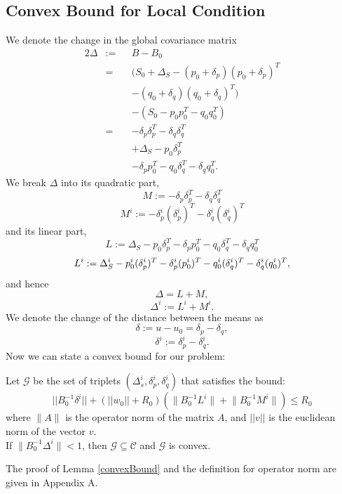 \subsection{Convex Bound for Local Condition}
We denote the change in the global covariance matrix
\begin{alignat*}{2}
\Delta & := && B-B_0 \\
& = && (S_0+\Delta_S - (p_0+\delta_p)(p_0+\delta_p)^T \\
& && - (q_0+\delta_q)(q_0+\delta_q)^T) \\
& && - (S_0 - p_0p_0^T - q_0q_0^T) \\
& = && - \delta_p\delta_p^T - \delta_q\delta_q^T \\
& && + \Delta_S - p_0\delta_p^T \\
& && - \delta_pp_0^T - q_0\delta_q^T - \delta_qq_0^T.
\end{alignat*}
We break $\Delta$ into its quadratic part,
\begin{equation*}
M:= - \delta_p\delta_p^T - \delta_q\delta_q^T
\end{equation*}
\begin{equation*}
M^i:= - \delta_p^i(\delta_p^i)^T - \delta_q^i(\delta_q^i)^T
\end{equation*}
and its linear part,
\begin{equation*}
L:= \Delta_S - p_0\delta_p^T - \delta_pp_0^T - q_0\delta_q^T - \delta_qq_0^T
\end{equation*}
\begin{equation*}
\\ L^i := \Delta_S^i - p_0^i(\delta_p^i)^T - \delta_p^i(p_0^i)^T -
q_0^i(\delta_q^i)^T - \delta_q^i(q_0^i)^T,
\end{equation*}
and hence
\begin{equation*}
\Delta= L+ M, 
\end{equation*}
\begin{equation*}
\Delta^i:= L^i+ M^i.
\end{equation*}
We denote the change of the distance between the means as
\begin{equation*}
\delta:= u-u_0 = \delta_p - \delta_q, 
\end{equation*}
\begin{equation*}
\delta^i:=\delta_p^i - \delta_q^i.
\end{equation*}
Now we can state a convex bound for our problem:
\begin{lemma} \label{convexBound}
Let $\mathcal{G}$ be the set of triplets $(\Delta_s^i, \delta_p^i, \delta_q^i)$
 that satisfies the bound:
 \begin{equation} \label{eq:convexBound}
||B_0^{-1}\delta^i|| + (||w_0||+R_0)(\Big \| B_0^{-1}L^i \Big \| + \Big \| B_0^{-1}M^i \Big \| ) \leq  R_0
\end{equation}
where $\Big \| A \Big \|$ is the operator norm of the matrix $A$, and $||v||$ is the euclidean norm of the vector $v$.
\\If $\Big \| B_0^{-1}\Delta^i \Big \| < 1$, then $\mathcal{G}\subseteq \mathcal{C}$ and $\mathcal{G}$ is convex.
\end{lemma}
The proof of Lemma \ref{convexBound} and the definition for operator norm are given in Appendix A.

